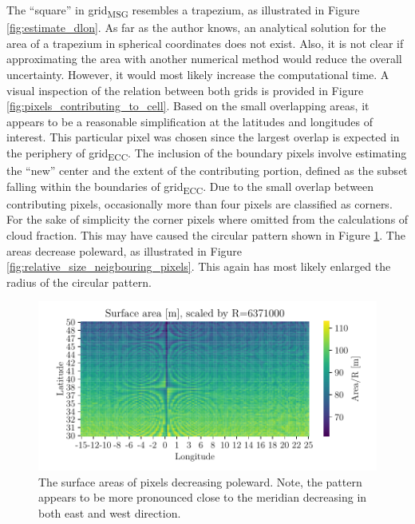 The ``square'' in grid\textsubscript{MSG} resembles a trapezium, as illustrated in Figure \ref{fig:estimate_dlon}. As far as the author knows, an analytical solution for the area of a trapezium in spherical coordinates does not exist. Also, it is not clear if approximating the area with another numerical method would reduce the overall uncertainty. However, it would most likely increase the computational time. 
A visual inspection of the relation between both grids is provided in 
Figure \ref{fig:pixels_contributing_to_cell}. Based on the small overlapping areas, it appears to be a reasonable simplification at the latitudes and longitudes of interest. This particular pixel was chosen since the largest overlap is expected in the periphery of grid\textsubscript{ECC}. The inclusion of the boundary pixels involve estimating the ``new'' center and the extent of the contributing portion, defined as the subset falling within the boundaries of grid\textsubscript{ECC}. Due to the small overlap between contributing pixels, occasionally more than four pixels are classified as corners. For the sake of simplicity the corner pixels where omitted from the calculations of cloud fraction. This may have caused the circular pattern shown in Figure \ref{fig:area_pixel_signal}. The areas decrease poleward, as illustrated in Figure \ref{fig:relative_size_neigbouring_pixels}. This again has most likely enlarged the radius of the circular pattern.
\begin{figure}[ht]
    \centering
    \includegraphics{python_figs/signal_area_pixel.pdf}
    \caption{The surface areas of pixels decreasing poleward. Note, the pattern appears to be more pronounced close to the meridian decreasing in both east and west direction.}
    \label{fig:area_pixel_signal}
\end{figure} 



